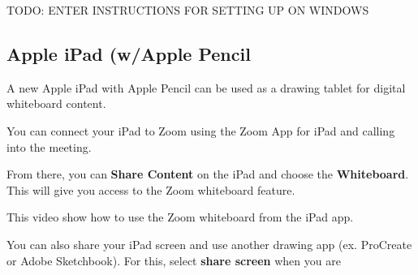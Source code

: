 \begin{gram}
\label{grm:displays::wacom::16::win-setup}

TODO: ENTER INSTRUCTIONS FOR SETTING UP ON WINDOWS
\end{gram}

\subsection{Apple iPad (w/Apple Pencil}
\label{sec:displays::idap}

\begin{gram}
\label{grm:displays::ipad}
A new Apple iPad with Apple Pencil can be used as a drawing tablet for digital whiteboard content.
\end{gram}

\begin{gram}
You can connect your iPad to Zoom using the Zoom App for iPad and calling into the meeting. 

From there, you can \textbf{Share Content} on the iPad and choose the \textbf{Whiteboard}. This will give you access to the Zoom whiteboard feature.

This video show how to use the Zoom whiteboard from the iPad app.

\end{gram}


\begin{gram}
You can also share your iPad screen and use another drawing app (ex. ProCreate or Adobe Sketchbook). For this, select \textbf{share screen} when you are 


\end{gram}


